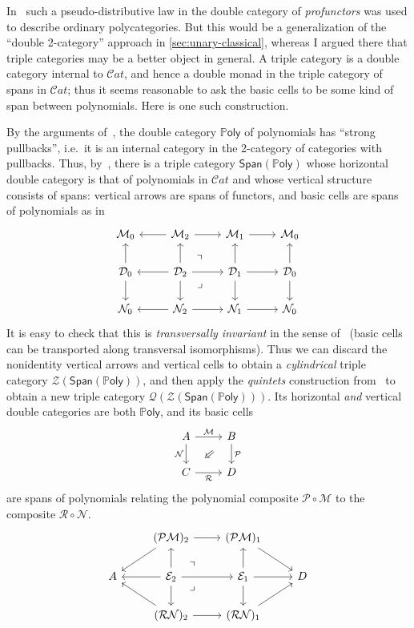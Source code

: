 \documentclass{article}
\theoremstyle{definition}
\theoremstyle{remark}
\def\M{\mathcal{M}}
\def\N{\mathcal{N}}
\def\Cat{\mathcal{C}\mathit{at}}
\def\D{\mathcal{D}}
\def\Poly{\mathbb{P}\mathsf{oly}}
\def\Span{\mathsf{Span}}
\def\sZ{\mathcal{Z}}
\def\sQ{\mathcal{Q}}
\def\twocell#1#2#3{\ar[from=#1,to=#2,phantom,""{name=1,near start},""{name=2,near end}]\ar[Rightarrow,from=1,to=2,"#3"]}
\def\drtwocell{\twocell{r}{d}}
\begin{document}
In~\cite{garner:polycats} such a pseudo-distributive law in the double category of \emph{profunctors} was used to describe ordinary polycategories.
But this would be a generalization of the ``double 2-category'' approach in \cref{sec:unary-classical}, whereas I argued there that triple categories may be a better object in general.
A triple category is a double category internal to $\Cat$, and hence a double monad in the triple category of spans in $\Cat$; thus it seems reasonable to ask the basic cells to be some kind of span between polynomials.
Here is one such construction.

By the arguments of~\cite[\S3.3]{weber:poly-pb}, the double category $\Poly$ of polynomials has ``strong pullbacks'', i.e.\ it is an internal category in the 2-category of categories with pullbacks.
Thus, by~\cite[\S6.1]{gp:intercategories-ii}, there is a triple category $\Span(\Poly)$ whose horizontal double category is that of polynomials in $\Cat$ and whose vertical structure consists of spans: vertical arrows are spans of functors, and basic cells are spans of polynomials as in
\[
\begin{tikzcd}
  \M_0 & \M_2 \ar[l] \ar[r] & \M_1 \ar[r] & \M_0\\
  \D_0 \ar[u] \ar[d] & \D_2 \ar[l] \ar[r] \ar[u] \ar[d] \ar[ur,phantom,near start,"\urcorner"] \ar[dr,phantom,near start,"\lrcorner"] & \D_1 \ar[r] \ar[u] \ar[d] & \D_0 \ar[u] \ar[d]\\
  \N_0 & \N_2 \ar[l] \ar[r] & \N_1 \ar[r] & \N_0
\end{tikzcd}
\]
It is easy to check that this is \emph{transversally invariant} in the sense of~\cite{pare:isotropic-intercats} (basic cells can be transported along transversal isomorphisms).
Thus we can discard the nonidentity vertical arrows and vertical cells to obtain a \emph{cylindrical} triple category $\sZ(\Span(\Poly))$, and then apply the \emph{quintets} construction from~\cite{pare:isotropic-intercats} to obtain a new triple category $\sQ(\sZ(\Span(\Poly)))$.
Its horizontal \emph{and} vertical double categories are both $\Poly$, and its basic cells
\[
\begin{tikzcd}
  A \ar[r,"\M"] \ar[d,swap,"\N"] \drtwocell{} & B \ar[d,"\mathcal{P}"] \\ C \ar[r,swap,"\mathcal{R}"] & D
\end{tikzcd}
\]
are spans of polynomials relating the polynomial composite $\mathcal{P}\circ\M$ to the composite $\mathcal{R}\circ\N$.
\[
\begin{tikzcd}
   & (\mathcal{P}\M)_2 \ar[dl] \ar[r] & (\mathcal{P}\M)_1 \ar[dr] & \\
  A & \mathcal{E}_2 \ar[l] \ar[r] \ar[u] \ar[d] \ar[ur,phantom,near start,"\urcorner"] \ar[dr,phantom,near start,"\lrcorner"] & \mathcal{E}_1 \ar[r] \ar[u] \ar[d] & D\\
   & (\mathcal{R}\N)_2 \ar[ul] \ar[r] & (\mathcal{R}\N)_1 \ar[ur] & 
\end{tikzcd}
\]
\end{document}
